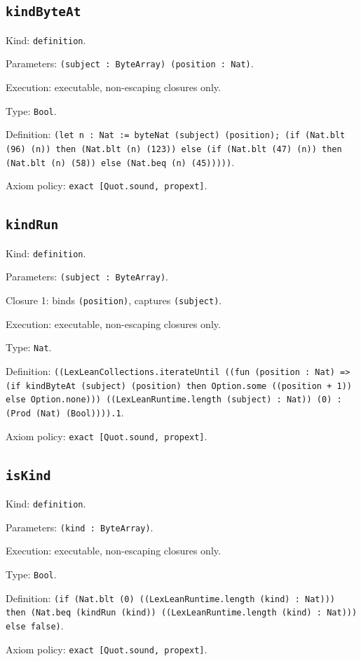 \documentclass[11pt]{article}
\begin{document}
\subsection*{\texttt{kindByteAt}}
\noindent Kind: \texttt{definition}.\par
\noindent Parameters: \texttt{(subject : ByteArray) (position : Nat)}.\par
\noindent Execution: executable, non-escaping closures only.\par
\noindent Type: \texttt{Bool}.\par
\noindent Definition: \texttt{(let n : Nat := byteNat (subject) (position); (if (Nat.blt (96) (n)) then (Nat.blt (n) (123)) else (if (Nat.blt (47) (n)) then (Nat.blt (n) (58)) else (Nat.beq (n) (45)))))}.\par
\noindent Axiom policy: \texttt{exact [Quot.sound, propext]}.\par
\subsection*{\texttt{kindRun}}
\noindent Kind: \texttt{definition}.\par
\noindent Parameters: \texttt{(subject : ByteArray)}.\par
\noindent Closure 1: binds \texttt{(position)}, captures \texttt{(subject)}.\par
\noindent Execution: executable, non-escaping closures only.\par
\noindent Type: \texttt{Nat}.\par
\noindent Definition: \texttt{((LexLeanCollections.iterateUntil ((fun (position : Nat) => (if kindByteAt (subject) (position) then Option.some ((position + 1)) else Option.none))) ((LexLeanRuntime.length (subject) : Nat)) (0) : (Prod (Nat) (Bool)))).1}.\par
\noindent Axiom policy: \texttt{exact [Quot.sound, propext]}.\par
\subsection*{\texttt{isKind}}
\noindent Kind: \texttt{definition}.\par
\noindent Parameters: \texttt{(kind : ByteArray)}.\par
\noindent Execution: executable, non-escaping closures only.\par
\noindent Type: \texttt{Bool}.\par
\noindent Definition: \texttt{(if (Nat.blt (0) ((LexLeanRuntime.length (kind) : Nat))) then (Nat.beq (kindRun (kind)) ((LexLeanRuntime.length (kind) : Nat))) else false)}.\par
\noindent Axiom policy: \texttt{exact [Quot.sound, propext]}.\par
\end{document}
